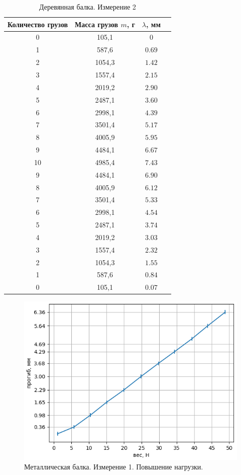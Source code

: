 \documentclass{article}
\begin{document}
\begin{table}[!h]
    \centering
    \begin{tabular}{|c|c|c|c|}
        \hline
         Количество грузов & Масса грузов $m$, г & $\lambda$, мм \\
         \hline
        0  & 105,1  & 0                 \\
        1  & 587,6  & $0.69$  \\
        2  & 1054,3 & $1.42$ \\
        3  & 1557,4 & $2.15$ \\
        4  & 2019,2 & $2.90$ \\
        5  & 2487,1 & $3.60$ \\
        6  & 2998,1 & $4.39$ \\
        7  & 3501,4 & $5.17$ \\
        8  & 4005,9 & $5.95$ \\
        9  & 4484,1 & $6.67$ \\
        10 & 4985,4 & $7.43$ \\
        9  & 4484,1 & $6.90$ \\
        8  & 4005,9 & $6.12$ \\
        7  & 3501,4 & $5.33$ \\
        6  & 2998,1 & $4.54$ \\
        5  & 2487,1 & $3.74$ \\
        4  & 2019,2 & $3.03$ \\
        3  & 1557,4 & $2.32$ \\
        2  & 1054,3 & $1.55$ \\
        1  & 587,6  & $0.84$ \\
        0  & 105,1  & $0.07$ \\
        \hline
    \end{tabular}
    \caption{Деревянная балка. Измерение 2}
\end{table}

\newpage

\begin{figure}
    \centering
    \includegraphics[width=0.9\linewidth]{металл 1 возраст.png}
    \caption{Металлическая балка. Измерение 1. Повышение нагрузки.}
    \label{fig:enter-label}
\end{figure}
\end{document}
